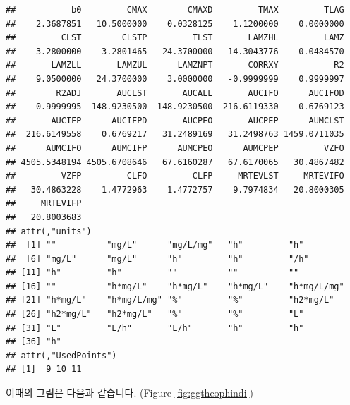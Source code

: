 \documentclass[9pt,]{krantz}
\newenvironment{Shaded}{\begin{snugshade}}{\end{snugshade}}
\newcommand{\DataTypeTok}[1]{\textcolor[rgb]{0.13,0.29,0.53}{#1}}
\newcommand{\DecValTok}[1]{\textcolor[rgb]{0.00,0.00,0.81}{#1}}
\newcommand{\KeywordTok}[1]{\textcolor[rgb]{0.13,0.29,0.53}{\textbf{#1}}}
\newcommand{\NormalTok}[1]{#1}
\newcommand{\OperatorTok}[1]{\textcolor[rgb]{0.81,0.36,0.00}{\textbf{#1}}}
\newcommand{\StringTok}[1]{\textcolor[rgb]{0.31,0.60,0.02}{#1}}
\begin{document}
\begin{verbatim}
##           b0         CMAX        CMAXD         TMAX         TLAG 
##    2.3687851   10.5000000    0.0328125    1.1200000    0.0000000 
##         CLST        CLSTP         TLST       LAMZHL         LAMZ 
##    3.2800000    3.2801465   24.3700000   14.3043776    0.0484570 
##       LAMZLL       LAMZUL      LAMZNPT       CORRXY           R2 
##    9.0500000   24.3700000    3.0000000   -0.9999999    0.9999997 
##        R2ADJ       AUCLST       AUCALL       AUCIFO      AUCIFOD 
##    0.9999995  148.9230500  148.9230500  216.6119330    0.6769123 
##       AUCIFP      AUCIFPD       AUCPEO       AUCPEP      AUMCLST 
##  216.6149558    0.6769217   31.2489169   31.2498763 1459.0711035 
##      AUMCIFO      AUMCIFP      AUMCPEO      AUMCPEP         VZFO 
## 4505.5348194 4505.6708646   67.6160287   67.6170065   30.4867482 
##         VZFP         CLFO         CLFP     MRTEVLST     MRTEVIFO 
##   30.4863228    1.4772963    1.4772757    9.7974834   20.8000305 
##     MRTEVIFP 
##   20.8003683 
## attr(,"units")
##  [1] ""          "mg/L"      "mg/L/mg"   "h"         "h"        
##  [6] "mg/L"      "mg/L"      "h"         "h"         "/h"       
## [11] "h"         "h"         ""          ""          ""         
## [16] ""          "h*mg/L"    "h*mg/L"    "h*mg/L"    "h*mg/L/mg"
## [21] "h*mg/L"    "h*mg/L/mg" "%"         "%"         "h2*mg/L"  
## [26] "h2*mg/L"   "h2*mg/L"   "%"         "%"         "L"        
## [31] "L"         "L/h"       "L/h"       "h"         "h"        
## [36] "h"        
## attr(,"UsedPoints")
## [1]  9 10 11
\end{verbatim}

이때의 그림은 다음과 같습니다. (Figure \ref{fig:ggtheophindi})

\begin{Shaded}
\end{Shaded}
\end{document}
